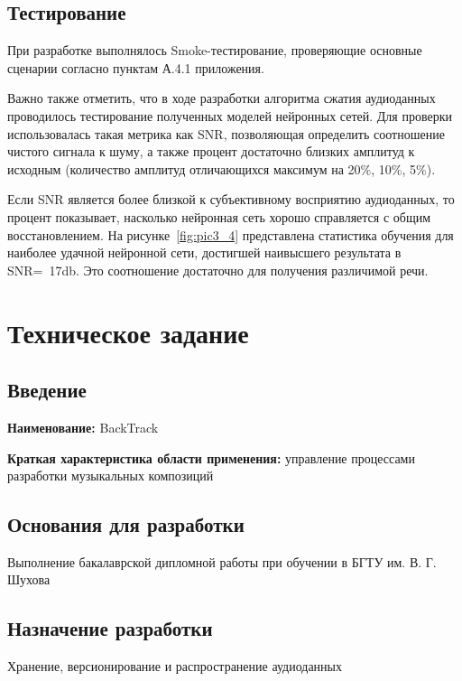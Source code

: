 \documentclass[14pt]{extarticle}
\begin{document}
\subsection{Тестирование}

При разработке выполнялось Smoke-тестирование, проверяющие основные сценарии согласно пунктам А.4.1 приложения. 

Важно также отметить, что в ходе разработки алгоритма сжатия аудиоданных проводилось тестирование полученных моделей нейронных сетей. 
Для проверки использовалась такая метрика как SNR, позволяющая определить соотношение чистого сигнала к шуму, а также процент 
достаточно близких амплитуд к исходным (количество амплитуд отличающихся максимум на 20\%, 10\%, 5\%). 

Если SNR является более близкой к субъективному восприятию аудиоданных, то процент показывает, насколько нейронная сеть хорошо справляется
с общим восстановлением. На рисунке~\ref{fig:pic3_4} представлена статистика обучения для наиболее удачной нейронной сети, достигшей наивысшего
результата в SNR=~17db. Это соотношение достаточно для получения различимой речи.




\appendix

\section{Техническое задание}

\subsection{Введение}

\textbf{Наименование:} BackTrack

\textbf{Краткая характеристика области применения:} управление процессами разработки музыкальных композиций

\subsection{Основания для разработки}

Выполнение бакалаврской дипломной работы при обучении в БГТУ им. В. Г. Шухова

\subsection{Назначение разработки}

Хранение, версионирование и распространение аудиоданных
\end{document}
